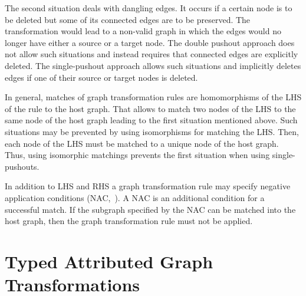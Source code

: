 The second situation deals with dangling edges. It occurs if a certain node is
to be deleted but some of its connected edges are to be preserved. The
transformation would lead to a non-valid graph in which the edges would no longer have
either a source or a target node. The double pushout approach does not allow
such situations and instead requires that connected edges are explicitly
deleted. The single-pushout approach allows such situations and implicitly
deletes edges if one of their source or target nodes is deleted.

In general, matches of graph transformation rules are homomorphisms of the LHS of the rule to the host graph.
That allows to match two nodes of the LHS to the same node of the host graph leading to the first situation mentioned above.
Such situations may be prevented by using isomorphisms for matching the LHS. Then, each node of the LHS must be matched to a unique node of the host graph.
Thus, using isomorphic matchings prevents the first situation when using single-pushouts.

In addition to LHS and RHS a graph transformation rule may specify negative application conditions (NAC,~\cite{Roz97}).
A NAC is an additional condition for a successful match.
If the subgraph specified by the NAC can be matched into the host graph, then the graph transformation rule must not be applied.



\section{Typed Attributed Graph Transformations}
\label{sec:foundations:typedAttrGTS}

